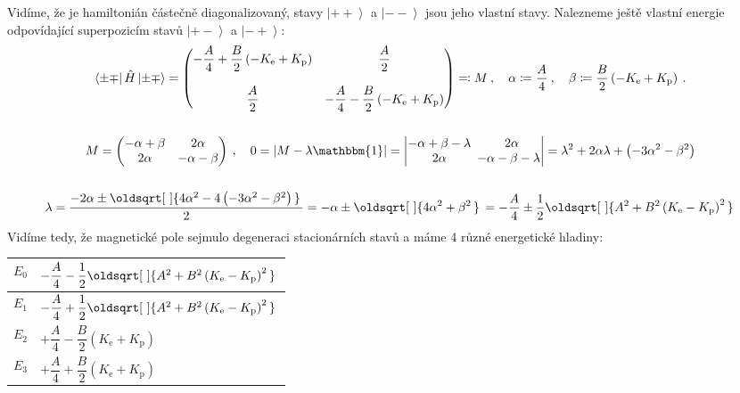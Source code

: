 \documentclass[10pt,a4paper]{article}
\renewcommand*{\sqrt}[2][\ ]{\oldsqrt[#1]{#2\,}\,}
\newcommand{\const}[1]{\text{#1}}
\newcommand{\mat}[1]{
    \begin{pmatrix}
        #1
    \end{pmatrix}
}
\newcommand{\bra}[1]{\left< #1 \right|}
\newcommand{\ket}[1]{\left| #1 \right>}
\def\1{\mathbbm{1}}
\begin{document}
Vidíme, že je hamiltonián částečně diagonalizovaný, stavy $\ket{++}$ a $\ket{--}$ jsou jeho vlastní stavy. Nalezneme ještě vlastní energie odpovídající superpozicím stavů $\ket{+-}$ a $\ket{-+}$:
\begin{gather*}
    \bra{\pm\mp} \hat H \ket{\pm\mp}
    = \mat{
        -\dfrac{A}{4} + \dfrac{B}{2}\left(-K_\const{e} + K_\const{p}\right) & \dfrac{A}{2} \\[15pt]
        \dfrac{A}{2} & -\dfrac{A}{4} - \dfrac{B}{2}\left(-K_\const{e} + K_\const{p}\right)
    } \eqqcolon M
    \: , \quad
    \alpha \coloneqq \frac{A}{4}
    \: , \quad
    \beta \coloneqq \frac{B}{2}\left(-K_\const{e} + K_\const{p}\right)
    \: .
    \\\\
    M = \mat{
        -\alpha + \beta & 2\alpha \\
        2\alpha & -\alpha - \beta
    }
    \: , \quad
    0 =
    \left| M - \lambda \1 \right| = \begin{vmatrix}
        -\alpha + \beta - \lambda & 2\alpha \\
        2\alpha & \!\!\! -\alpha - \beta - \lambda
    \end{vmatrix}
    = \lambda^2 + 2\alpha\lambda + \left(-3\alpha^2 - \beta^2\right)
    \\\\
    \lambda
    = \frac{-2\alpha \pm \sqrt{4\alpha^2 - 4\left(-3\alpha^2 - \beta^2\right)}}{2}
    = -\alpha \pm \sqrt{4\alpha^2 + \beta^2}
    = -\frac{A}{4} \pm \frac{1}{2} \sqrt{A^2 + B^2 \left(K_\const{e} - K_\const{p}\right)^2}
\end{gather*}
Vidíme tedy, že magnetické pole sejmulo degeneraci stacionárních stavů a máme 4 různé energetické hladiny:
\begin{table}[h!]
    \centering
    \begin{tabular}{ r|l }
        $E_0$ &
        $-\dfrac{A}{4} - \dfrac{1}{2} \sqrt{A^2 + B^2 \left(K_\const{e} - K_\const{p}\right)^2}$
        \\[10pt]\hline
        \rule{0pt}{1.5\normalbaselineskip}
        $E_1$ &
        $-\dfrac{A}{4} + \dfrac{1}{2} \sqrt{A^2 + B^2 \left(K_\const{e} - K_\const{p}\right)^2}$
        \\[10pt]\hline
        \rule{0pt}{1.5\normalbaselineskip}
        $E_2$ &
        $+\dfrac{A}{4} - \dfrac{B}{2} \left( K_\const{e} + K_\const{p}\right)$
        \\[10pt]\hline
        \rule{0pt}{1.5\normalbaselineskip}
        $E_3$ &
        $+\dfrac{A}{4} + \dfrac{B}{2} \left( K_\const{e} + K_\const{p}\right)$
    \end{tabular}
\end{table}
\end{document}
